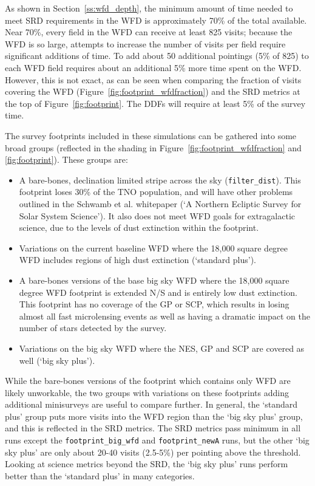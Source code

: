 As shown in Section~\ref{ss:wfd_depth}, the minimum amount of time needed to meet SRD requirements in the WFD is approximately 70\% of the total available. Near 70\%, every field in the WFD can receive at least 825 visits;  because the WFD is so large, attempts to increase the number of visits per field require significant additions of time. To add about 50 additional pointings (5\% of 825) to each WFD field requires about an additional 5\% more time spent on the WFD. However, this is not exact, as can be seen when comparing the fraction of visits covering the WFD (Figure~\ref{fig:footprint_wfdfraction}) and the SRD metrics at the top of Figure~\ref{fig:footprint}. The DDFs will require at least 5\% of the survey time. 

The survey footprints included in these simulations can be gathered into some broad groups (reflected in the shading in Figure~\ref{fig:footprint_wfdfraction} and \ref{fig:footprint}). These groups are:
\begin{itemize}
\item A bare-bones, declination limited stripe across the sky ({\tt filter\_dist}). This footprint loses 30\% of the TNO population, and will have other problems outlined in the Schwamb et al. whitepaper (`A Northern Ecliptic Survey for Solar System Science'). It also does not meet WFD goals for extragalactic science, due to the levels of dust extinction within the footprint.
\item Variations on the current baseline WFD where the 18,000 square degree WFD includes regions of high dust extinction (`standard plus').
\item A bare-bones versions of the base big sky WFD where the 18,000 square degree WFD footprint is extended N/S and is entirely low dust extinction. This footprint has no coverage of the GP or SCP, which results in losing almost all fast microlensing events as well as having a dramatic impact on the number of stars detected by the survey.
\item Variations on the big sky WFD where the NES, GP and SCP are covered as well (`big sky plus'). 
\end{itemize}
While the bare-bones versions of the footprint which contains only WFD are likely unworkable, the two groups with variations on these footprints adding additional minisurveys are useful to compare further.
In general, the `standard plus' group puts more visits into the WFD region than the `big sky plus' group, and this is reflected in the SRD metrics. The SRD metrics pass minimum in all runs except the {\tt footprint\_big\_wfd} and {\tt footprint\_newA} runs, but the other `big sky plus' are only about 20-40 visits  (2.5-5\%) per pointing above the threshold. Looking at science metrics beyond the SRD, the `big sky plus' runs perform better than the `standard plus' in many categories.

